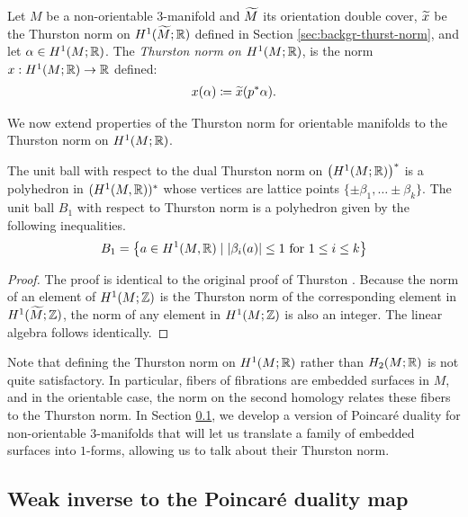 \begin{defn}
  Let $M$ be a non-orientable 3-manifold and $\widetilde{M}$ its orientation double cover, $\widetilde{x}$ be the Thurston norm on $H^1(\widetilde{M};\mathbb{R})$ defined in Section \ref{sec:backgr-thurst-norm}, and let $\alpha \in H^1(M;\mathbb{R})$.
  The \emph{Thurston norm on $H^1(M; \mathbb{R})$}, is the norm $x: H^1(M;\mathbb{R}) \rightarrow \mathbb{R}$ defined:
  \begin{align*}
    x(\alpha) \coloneqq \widetilde{x}(p^{\ast}\alpha).
  \end{align*}
\end{defn}

We now extend properties of the Thurston norm for orientable manifolds to the Thurston norm on $H^1(M;\mathbb{R})$.
\begin{thm}
  The unit ball with respect to the dual Thurston norm on $\left( H^1(M; \mathbb{R}) \right)^{\ast}$ is a polyhedron in $(H^1(M,\mathbb{R}))^\ast$ whose vertices are lattice points $\{\pm \beta_1, \ldots \pm \beta_k\}$.
  The unit ball $B_1$ with respect to Thurston norm is a polyhedron given by the following inequalities.
  \begin{align*}
    B_1 = \left\{ a\in H^1(M,\mathbb{R}) \mid \left| \beta_i(a) \right| \leq 1 \text{ for $1\leq i \leq k$} \right\}
  \end{align*}
\end{thm}

\begin{proof}
  The proof is identical to the original proof of Thurston \cite[Theorem 2]{thurston1986norm}.
  Because the norm of an element of $H^1(M; \mathbb{Z})$ is the Thurston norm of the corresponding element in $H^1(\widetilde{M}; \mathbb{Z})$, the norm of any element in $H^1(M; \mathbb{Z})$ is also an integer.
  The linear algebra follows identically.
\end{proof}

Note that defining the Thurston norm on $H^1(M; \mathbb{R})$ rather than $H_2(M; \mathbb{R})$ is not quite satisfactory.
In particular, fibers of fibrations are embedded surfaces in $M$, and in the orientable case, the norm on the second homology relates these fibers to the Thurston norm.
In Section \ref{sec:weak-inverse-poinc}, we develop a version of Poincar\'e duality for non-orientable 3-manifolds that will let us translate a family of embedded surfaces into $1$-forms, allowing us to talk about their Thurston norm.

\subsection{Weak inverse to the Poincar\'e duality map}
\label{sec:weak-inverse-poinc}

